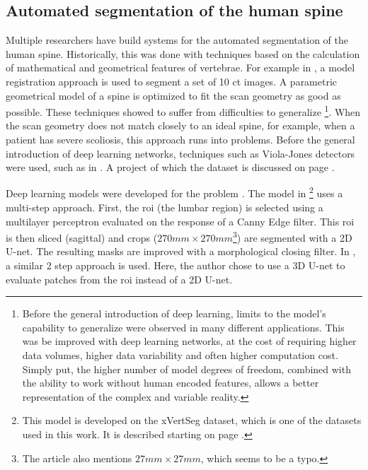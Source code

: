 \subsection{Automated segmentation of the human spine}
\par{
    Multiple researchers have build systems for the automated segmentation of the human spine.
    Historically, this was done with techniques based on the calculation of mathematical and geometrical features of vertebrae. 
    For example in \cite{Klinder2008}, a model registration approach is used to segment a set of 10 \acrshort{ct} images.
    A parametric geometrical model of a spine is optimized to fit the scan geometry as good as possible.
    These techniques showed to suffer from difficulties to generalize
    \footnote{Before the general introduction of deep learning, limits to the model's capability to generalize were observed in many different applications.
    This was be improved with deep learning networks, at the cost of requiring higher data volumes, higher data variability and often higher computation cost.
    Simply put, the higher number of model degrees of freedom, combined with the ability to work without human encoded features, allows a better representation of the complex and variable reality.}. 
    When the scan geometry does not match closely to an ideal spine, for example, when a patient has severe scoliosis, this approach runs into problems.
    Before the general introduction of deep learning networks, techniques such as Viola-Jones detectors were used, such as in \cite{Zukic2014}. 
    A project of which the dataset is discussed on page \pageref{sec:DataUSiegen}.
}
\par{
    Deep learning models were developed for the problem \cite{Sekuboyina2017, Janssens2018, Chuang2019, Lessmann2018}.
    The model in \cite{Sekuboyina2017}\footnote{This model is developed on the xVertSeg dataset, which is one of the datasets used in this work. It is described starting on page \pageref{sec:xVertSeg}.} 
    uses a multi-step approach. First, the \acrfull{roi} (the lumbar region) is selected using a multilayer perceptron evaluated on the response of a Canny Edge filter.
    This \acrshort{roi} is then sliced (sagittal) and crops ($270mm \times 270mm$\footnote{The article also mentions $27mm \times 27mm$, which seems to be a typo.}) are segmented with a 2D U-net. 
    The resulting masks are improved with a morphological closing filter. 
    In \cite{Janssens2018}, a similar 2 step approach is used. Here, the author chose to use a 3D U-net to evaluate patches from the \acrshort{roi} instead of a 2D U-net.
}

